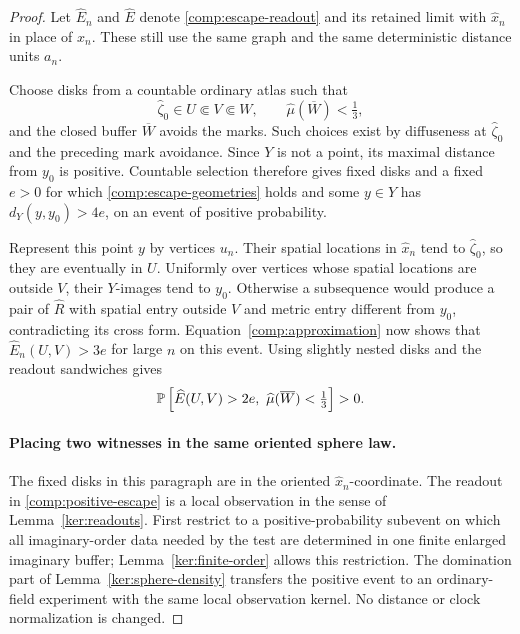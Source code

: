 \begin{proof}
Let $\widehat E_n$ and $\widehat E$ denote
\eqref{comp:escape-readout} and its retained limit with
$\widehat x_n$ in place of $x_n$.  These still use the same graph
and the same deterministic distance units $a_n$.

Choose disks from a countable ordinary atlas such that
\begin{equation}
 \label{comp:escape-geometries}
 \widehat\zeta_0\in U\Subset V\Subset W,\qquad
 \widehat\mu(\overline W)<\tfrac13,
\end{equation}
and the closed buffer $\overline W$ avoids the marks.  Such choices
exist by diffuseness at $\widehat\zeta_0$ and the preceding mark avoidance.
Since $Y$ is not a point, its maximal distance from $y_0$ is
positive.  Countable selection therefore gives fixed disks and
a fixed $e>0$ for which \eqref{comp:escape-geometries} holds and
some $y\in Y$ has $d_Y(y,y_0)>4e$, on an event of positive
probability.

Represent this point $y$ by vertices $u_n$.  Their spatial
locations in $\widehat x_n$ tend to $\widehat\zeta_0$, so they are
eventually in $U$.  Uniformly
over vertices whose spatial locations are outside $V$, their
$Y$-images tend to $y_0$.  Otherwise a subsequence would produce
a pair of $\widehat R$ with spatial entry outside $V$ and metric
entry different from $y_0$, contradicting its cross form.
Equation~\eqref{comp:approximation} now shows that
$\widehat E_n(U,V)>3e$ for large $n$ on this event.
Using slightly nested disks and the readout sandwiches gives
\begin{equation}
 \label{comp:positive-escape}
 \PP\left[\widehat E(U,V)>2e,\
          \widehat\mu(\overline W)<\tfrac13\right]>0.
\end{equation}

\paragraph{Placing two witnesses in the same oriented sphere law.}
The fixed disks in this paragraph are in the oriented
$\widehat x_n$-coordinate.  The readout in
\eqref{comp:positive-escape} is a local observation
in the sense of Lemma~\ref{ker:readouts}.  First restrict to a
positive-probability subevent on which all imaginary-order data
needed by the test are determined in one finite enlarged
imaginary buffer; Lemma~\ref{ker:finite-order} allows this
restriction.  The domination part of
Lemma~\ref{ker:sphere-density} transfers the positive event to an
ordinary-field experiment with the same local observation
kernel.  No distance or clock normalization is changed.


\end{proof}
